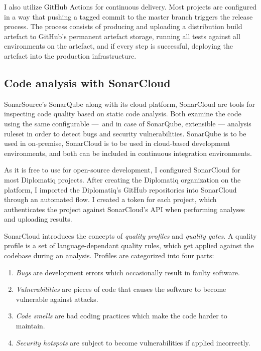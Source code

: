 I also utilize GitHub Actions for continuous delivery. Most projects are configured in a way that pushing a tagged commit to the master branch triggers the release process. The process consists of producing and uploading a distribution build artefact to GitHub's permanent artefact storage, running all tests against all environments on the artefact, and if every step is successful, deploying the artefact into the production infrastructure.

\subsection{Code analysis with SonarCloud}

SonarSource's SonarQube along with its cloud platform, SonarCloud are tools for inspecting code quality based on static code analysis. Both examine the code using the same configurable — and in case of SonarQube, extensible — analysis ruleset in order to detect bugs and security vulnerabilities. SonarQube is to be used in on-premise, SonarCloud is to be used in cloud-based development environments, and both can be included in continuous integration environments.

As it is free to use for open-source development, I configured SonarCloud for most Diplomatiq projects. After creating the Diplomatiq organization on the platform, I imported the Diplomatiq's GitHub repositories into SonarCloud through an automated flow. I created a token for each project, which authenticates the project against SonarCloud's API when performing analyses and uploading results.

SonarCloud introduces the concepts of \emph{quality profiles} and \emph{quality gates}. A quality profile is a set of language-dependant quality rules, which get applied against the codebase during an analysis. Profiles are categorized into four parts:

\begin{enumerate}
\item \emph{Bugs} are development errors which occasionally result in faulty software.
\item \emph{Vulnerabilities} are pieces of code that causes the software to become vulnerable against attacks.
\item \emph{Code smells} are bad coding practices which make the code harder to maintain.
\item \emph{Security hotspots} are subject to become vulnerabilities if applied incorrectly.
\end{enumerate}

